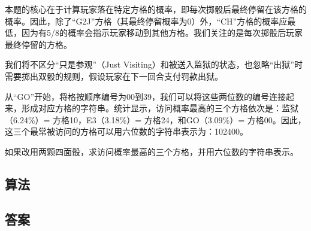 \begin{tcolorbox}[breakable]
	本题的核心在于计算玩家落在特定方格的概率，即每次掷骰后最终停留在该方格的概率。因此，除了\enquote{G2J}方格（其最终停留概率为0）外，\enquote{CH}方格的概率应最低，因为有5/8的概率会指示玩家移动到其他方格。我们关注的是每次掷骰后玩家最终停留的方格。

	我们将不区分\enquote{只是参观}（Just Visiting）和被送入监狱的状态，也忽略\enquote{出狱}时需要掷出双骰的规则，假设玩家在下一回合支付罚款出狱。

	从\enquote{GO}开始，将格按顺序编号为00到39，我们可以将这些两位数的编号连接起来，形成对应方格的字符串。统计显示，访问概率最高的三个方格依次是：监狱（6.24\%）= 方格10，E3（3.18\%）= 方格24，和GO（3.09\%）= 方格00。因此，这三个最常被访问的方格可以用六位数的字符串表示为：102400。

	如果改用两颗四面骰，求访问概率最高的三个方格，并用六位数的字符串表示。

\end{tcolorbox}

\subsection{算法}

\subsection{答案}
